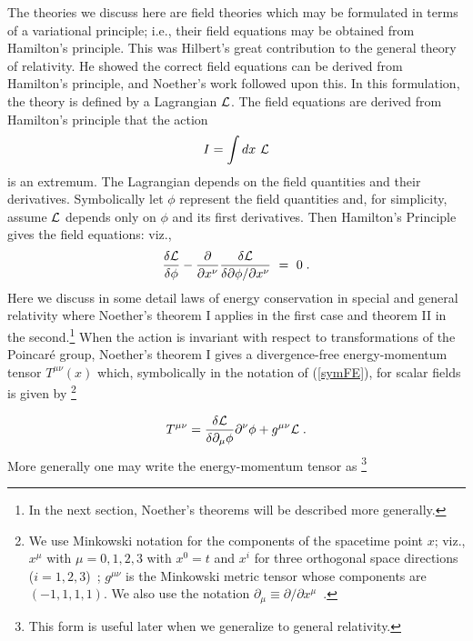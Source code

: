 \documentclass[12pt]{article}
\begin{document}
The theories we discuss here  are field theories which may be formulated in
terms of a variational principle; i.e., their field 
 equations may be obtained from Hamilton's principle.
This was Hilbert's great contribution to the general theory of relativity. He showed the correct field equations can be derived from  Hamilton's 
principle, and   Noether's work followed upon this. 
In this formulation, the theory is defined by a Lagrangian $\cal{L}$. The
field equations are derived from Hamilton's principle that the action
\begin{equation} 
I = \int dx ~\cal{L} \label{act}
\end{equation}
is an extremum. The Lagrangian depends on the field quantities and their
derivatives. Symbolically let $\phi$ represent the field quantities and,
for simplicity,
 assume $\cal{L}$ depends only on $\phi$ and its first derivatives.
Then Hamilton's Principle gives 
 the field equations: viz.,  
 \begin{equation} {\delta {\cal{L}}
\over \delta \phi} - {\partial \over \partial x^\nu}{\delta{\cal{L}} \over
\delta\partial \phi/\partial x^\nu } ~ = ~ 0 \; .  \label{symFE} 
\end{equation}
Here we discuss in some detail laws of energy
conservation in special and general relativity where Noether's theorem I
applies in the first case and theorem II in the second.\footnote{
 In the next section, Noether's
theorems  will be described more generally.}
 When the action is invariant with respect to 
transformations of the Poincar\'{e} 
group,   Noether's theorem I gives a divergence-free
 energy-momentum  tensor $T^{\mu\nu}(x)$ which, symbolically in the notation of 
  (\ref{symFE}), for scalar fields is given by%
\footnote{ We use Minkowski notation for the components
of the spacetime point $x$; viz., $x^\mu$ with $\mu = 0, 1, 2, 3$ with $x^0 = t$
and $x^i$ for three orthogonal space directions ($ i = 1, 2, 3$)~;
 $g^{\mu\nu}$ is the Minkowski metric tensor whose components are 
$(-1, 1, 1, 1)$. We also use the notation $\partial_{\mu} \equiv \partial / 
\partial x^\mu $~.} 

\begin{equation}
T^{\mu\nu} = {\delta {\cal{L}}\over \delta \partial_{\mu} \phi} \partial^\nu 
\phi + g^{\mu\nu} {\cal{L}}\; .  \label{Tmunu} 
\end{equation}
More generally one may write the energy-momentum tensor as%
\footnote{This form is useful  later when we generalize to general relativity.}
\end{document}
